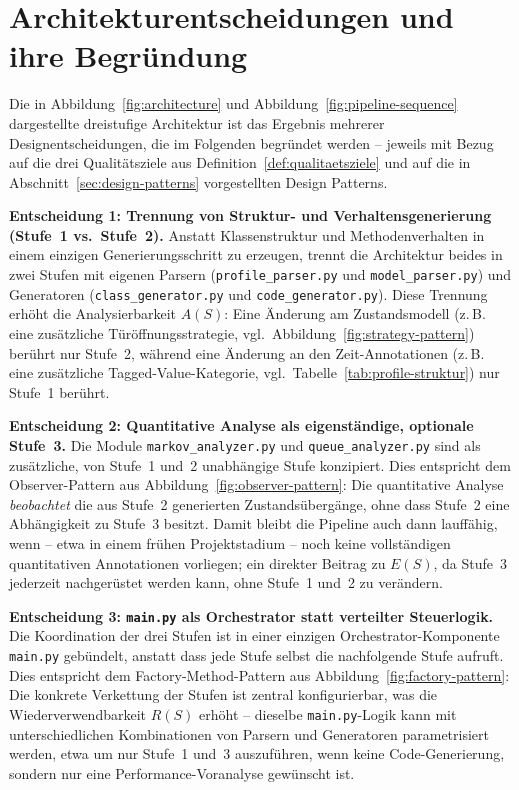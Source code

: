 ﻿\documentclass[a4paper,12pt]{report}
\theoremstyle{definition}
\begin{document}
\section{Architekturentscheidungen und ihre Begründung}
\label{sec:architekturentscheidungen}

Die in Abbildung~\ref{fig:architecture} und Abbildung~\ref{fig:pipeline-sequence}
dargestellte dreistufige Architektur ist das Ergebnis mehrerer
Designentscheidungen, die im Folgenden begründet werden -- jeweils mit
Bezug auf die drei Qualitätsziele aus Definition~\ref{def:qualitaetsziele}
und auf die in Abschnitt~\ref{sec:design-patterns} vorgestellten Design
Patterns.

\textbf{Entscheidung 1: Trennung von Struktur- und Verhaltensgenerierung
(Stufe~1 vs.\ Stufe~2).} Anstatt Klassenstruktur und Methodenverhalten in
einem einzigen Generierungsschritt zu erzeugen, trennt die Architektur
beides in zwei Stufen mit eigenen Parsern (\texttt{profile\_parser.py} und
\texttt{model\_parser.py}) und Generatoren (\texttt{class\_generator.py} und
\texttt{code\_generator.py}). Diese Trennung erhöht die Analysierbarkeit
$A(S)$: Eine Änderung am Zustandsmodell (z.\,B. eine zusätzliche
Türöffnungsstrategie, vgl.\ Abbildung~\ref{fig:strategy-pattern}) berührt nur
Stufe~2, während eine Änderung an den Zeit-Annotationen (z.\,B. eine
zusätzliche Tagged-Value-Kategorie, vgl.\ Tabelle~\ref{tab:profile-struktur})
nur Stufe~1 berührt.

\textbf{Entscheidung 2: Quantitative Analyse als eigenständige, optionale
Stufe~3.} Die Module \texttt{markov\_analyzer.py} und
\texttt{queue\_analyzer.py} sind als zusätzliche, von Stufe~1 und~2
unabhängige Stufe konzipiert. Dies entspricht dem Observer-Pattern aus
Abbildung~\ref{fig:observer-pattern}: Die quantitative Analyse
\emph{beobachtet} die aus Stufe~2 generierten Zustandsübergänge, ohne dass
Stufe~2 eine Abhängigkeit zu Stufe~3 besitzt. Damit bleibt die Pipeline
auch dann lauffähig, wenn -- etwa in einem frühen Projektstadium -- noch
keine vollständigen quantitativen Annotationen vorliegen; ein direkter
Beitrag zu $E(S)$, da Stufe~3 jederzeit nachgerüstet werden kann, ohne
Stufe~1 und~2 zu verändern.

\textbf{Entscheidung 3: \texttt{main.py} als Orchestrator statt verteilter
Steuerlogik.} Die Koordination der drei Stufen ist in einer einzigen
Orchestrator-Komponente \texttt{main.py} gebündelt, anstatt dass jede Stufe
selbst die nachfolgende Stufe aufruft. Dies entspricht dem
Factory-Method-Pattern aus Abbildung~\ref{fig:factory-pattern}: Die
konkrete Verkettung der Stufen ist zentral konfigurierbar, was die
Wiederverwendbarkeit $R(S)$ erhöht -- dieselbe \texttt{main.py}-Logik kann
mit unterschiedlichen Kombinationen von Parsern und Generatoren
parametrisiert werden, etwa um nur Stufe~1 und~3 auszuführen, wenn keine
Code-Generierung, sondern nur eine Performance-Voranalyse gewünscht ist.
\end{document}
